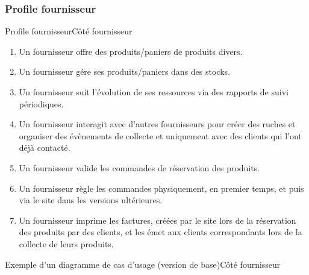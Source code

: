 \documentclass[usenames,dvipsnames]{beamer}
\begin{document}
\subsubsection*{Profile fournisseur}
\begin{frame}{Profile fournisseur}{Côté fournisseur}
\begin{enumerate}
  \item Un fournisseur offre des produits/paniers de produits divers.
  \item Un fournisseur gére ses produits/paniers dans des stocks.
  \item Un fournisseur suit l'évolution de ses ressources via des rapports de suivi périodiques.
  \item Un fournisseur interagit avec d'autres fournisseurs pour créer des ruches et organiser des évènements de collecte et uniquement avec des clients qui l'ont déjà contacté.
  \item Un fournisseur valide les commandes de réservation des produits.
  \item Un fournisseur règle les commandes physiquement, en premier temps, et puis via le site dans les versions ultérieures.
  \item Un fournisseur imprime les factures, créées par le site lors de la réservation des produits par des clients, et les émet aux clients correspondants lors de la collecte de leurs produits.
\end{enumerate}
\end{frame}

\begin{frame}{Exemple d'un diagramme de cas d'usage (version de base)}{Côté fournisseur}
\begin{figure}[!ht]
  \centering
\end{figure}
\end{frame}
\end{document}
